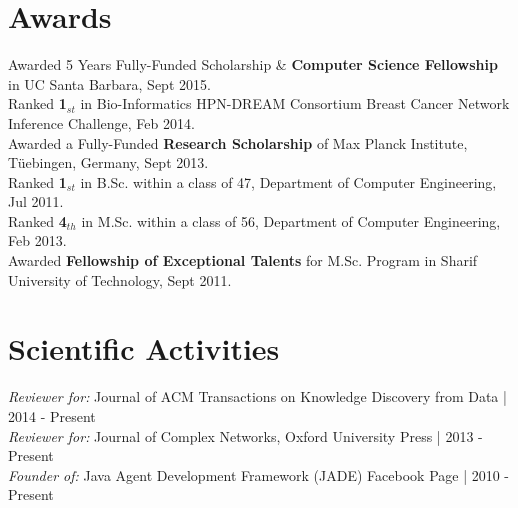 \documentclass[letter]{res}
\begin{document}
\begin{resume}
\begin{enumerate}[leftmargin=-.01in]
		\end{enumerate}
		
		
		\section{Awards}
		Awarded 5 Years Fully-Funded Scholarship \& \textbf{Computer Science Fellowship} in UC Santa Barbara, Sept 2015.\\
		Ranked \textbf{1}$_{st}$ in Bio-Informatics HPN-DREAM Consortium Breast Cancer Network Inference Challenge, Feb 2014.\\
		Awarded a Fully-Funded \textbf{Research Scholarship} of Max Planck Institute, Tüebingen, Germany, Sept 2013.\\
		Ranked \textbf{1}$_{st}$ in B.Sc. within a class of 47, Department of Computer Engineering, Jul 2011.\\
		Ranked \textbf{4}$_{th}$ in M.Sc. within a class of 56, Department of Computer Engineering, Feb 2013.\\
		Awarded \textbf{Fellowship of Exceptional Talents} for M.Sc. Program in Sharif University of Technology, Sept 2011.
		
		
		\section{Scientific Activities}
		{\sl Reviewer for:  }Journal of ACM Transactions on Knowledge Discovery from Data | 2014 - Present\\
		{\sl Reviewer for:  }Journal of Complex Networks, Oxford University Press | 2013 - Present\\
		{\sl Founder of:  }Java Agent Development Framework (JADE) Facebook Page | 2010 - Present
		
		
		

\end{resume}
\end{document}
